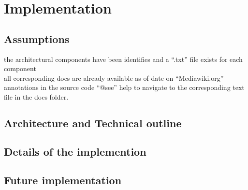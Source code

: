 \chapter{Implementation}\label{chapter:Implementation}

\section{Assumptions}
\indent the architectural components have been identifies and a \enquote{.txt} file exists for each component
\\\indent all corresponding docs are already available as of date on  \enquote{Mediawiki.org}
\\\indent annotations in the source code \enquote{@see} help to navigate to the corresponding text file in the docs folder.
\section{Architecture and Technical outline}
\section{Details of the implemention}

\section{Future implementation}
 
		

